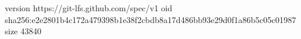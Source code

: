 version https://git-lfs.github.com/spec/v1
oid sha256:e2e2801b4c172a479398b1e38f2cbdb8a17d486bb93e29d0f1a86b5c05c01987
size 43840
